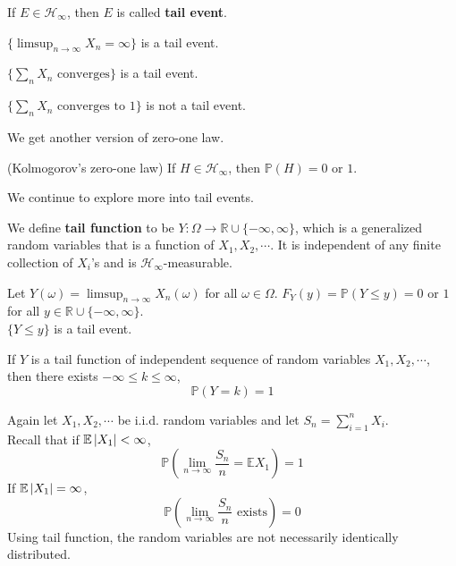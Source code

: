 \documentclass{huhtakm-template-book}
\newcommand{\prob}{\mathbb{P}}
\newcommand{\expect}{\mathbb{E}}
\begin{document}
\begin{rem}
	If $E\in\mathcal{H}_{\infty}$, then $E$ is called \textbf{tail event}.
\end{rem}
\begin{eg}
	$\{\limsup_{n\to\infty}X_{n}=\infty\}$ is a tail event.
\end{eg}
\begin{eg}
	$\{\sum_{n}X_{n}\text{ converges}\}$ is a tail event.
\end{eg}
\begin{eg}
	$\{\sum_{n}X_{n}\text{ converges to }1\}$ is not a tail event.
\end{eg}
We get another version of zero-one law.
\begin{thm}(Kolmogorov's zero-one law)
	If $H\in\mathcal{H}_{\infty}$, then $\prob(H)=0$ or $1$.
\end{thm}
We continue to explore more into tail events.
\begin{defn}
	We define \textbf{tail function} to be $Y:\Omega\to\mathbb{R}\cup\{-\infty,\infty\}$, which is a generalized random variables that is a function of $X_{1},X_{2},\cdots$. It is independent of any finite collection of $X_{i}$'s and is $\mathcal{H}_{\infty}$-measurable.
\end{defn}
\begin{eg}
	Let $Y(\omega)=\limsup_{n\to\infty}X_{n}(\omega)$ for all $\omega\in\Omega$. $F_{Y}(y)=\prob(Y\leq y)=0$ or $1$ for all $y\in\mathbb{R}\cup\{-\infty,\infty\}$.\\
	$\{Y\leq y\}$ is a tail event.
\end{eg}
\begin{thm}
	If $Y$ is a tail function of independent sequence of random variables $X_{1},X_{2},\cdots$, then there exists $-\infty\leq k\leq\infty$,
	\begin{equation*}
		\prob(Y=k)=1
	\end{equation*}
\end{thm}
Again let $X_{1},X_{2},\cdots$ be i.i.d. random variables and let $S_{n}=\sum_{i=1}^{n}X_{i}$.\\
Recall that if $\expect\abs{X_{1}}<\infty$,
\begin{equation*}
	\prob\left(\lim_{n\to\infty}\frac{S_{n}}{n}=\expect X_{1}\right)=1
\end{equation*}
If $\expect\abs{X_{1}}=\infty$,
\begin{equation*}
	\prob\left(\lim_{n\to\infty}\frac{S_{n}}{n}\text{ exists}\right)=0
\end{equation*}
Using tail function, the random variables are not necessarily identically distributed.
\end{document}
